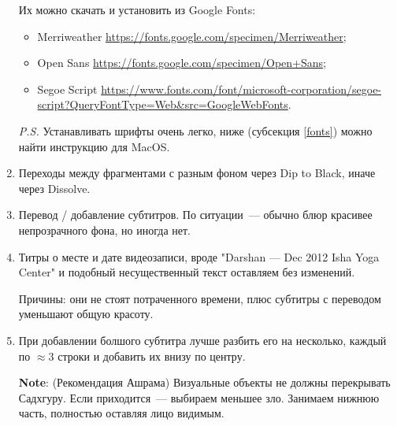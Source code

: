 \documentclass[
a4paper, %
12pt, %
article,
onecolumn, %
openany, %
]{memoir}
\begin{document}
\begin{enumerate}
    Их можно скачать и установить из Google Fonts:
    \begin{itemize}
        \item  Merriweather \href{https://fonts.google.com/specimen/Merriweather}{\small https://fonts.google.com/specimen/Merriweather};
        \item Open Sans \href{https://fonts.google.com/specimen/Open+Sans}{\small https://fonts.google.com/specimen/Open+Sans};
    \item Segoe Script \href{https://www.fonts.com/font/microsoft-corporation/segoe-script?QueryFontType=Web&src=GoogleWebFonts}{\small https://www.fonts.com/font/microsoft-corporation/segoe-script?QueryFontType=Web\&src=GoogleWebFonts}.
      \end{itemize}

      \emph{P.S.} Устанавливать шрифты очень легко, ниже (субсекция \ref{fonts}) можно
      найти инструкцию для MacOS.


\item Переходы между фрагментами с разным фоном через Dip to Black, иначе через Dissolve.


\item Перевод / добавление субтитров. По ситуации~--- обычно блюр красивее непрозрачного фона, но иногда нет. 

\item Титры о месте и дате видеозаписи, вроде "Darshan — Dec 2012
    Isha Yoga Center" и подобный несущественный текст оставляем без изменений.

    {\color{gray} Причины: они не стоят потраченного времени, плюс 
     субтитры с переводом уменьшают  общую красоту.}
 \item При добавлении болшого субтитра лучше разбить его на несколько, каждый
     по $\approx 3$ строки и добавить их внизу по центру. 

     \textbf{Note}: (Рекомендация Ашрама) Визуальные объекты не должны перекрывать 
     Садхгуру. Если приходится~--- выбираем меньшее зло. Занимаем нижнюю часть, 
     полностью оставляя лицо видимым.
\end{enumerate}
\end{document}
